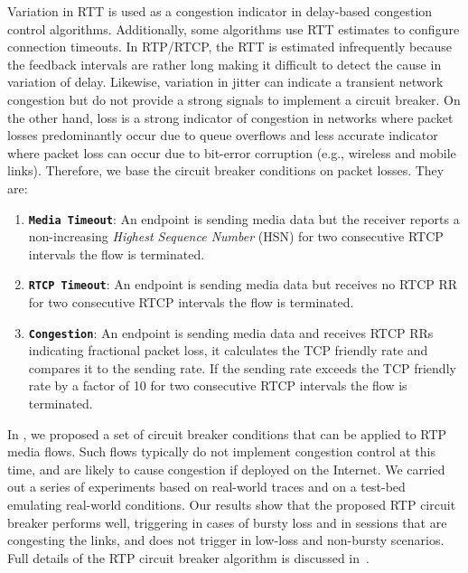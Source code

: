 Variation in RTT is used as a congestion indicator in delay-based congestion
control  algorithms. Additionally, some algorithms use RTT estimates to
configure connection timeouts. In RTP/RTCP, the RTT is estimated infrequently
because the feedback intervals are rather long making it difficult to detect
the cause in  variation of delay. Likewise, variation in jitter can indicate a
transient network congestion but do not  provide a strong signals to implement
a circuit breaker. On the other hand, loss is a strong indicator of congestion
in networks where  packet losses predominantly occur due to queue overflows
and less accurate indicator where packet loss can occur due to bit-error
corruption (e.g., wireless  and mobile links). Therefore, we base the circuit
breaker conditions on packet losses. They are:

\begin{enumerate}
\setlength{\itemsep}{0pt}

\item \textbf{\texttt{Media Timeout}}: An endpoint is sending media data but
the receiver reports a non-increasing \emph{Highest Sequence Number} (HSN) for
two consecutive RTCP intervals the flow is terminated.

\item \textbf{\texttt{RTCP Timeout}}: An endpoint is sending media data but
receives no RTCP RR for two consecutive RTCP intervals the flow is terminated.

\item \textbf{\texttt{Congestion}}: An endpoint is sending media data and
receives RTCP RRs indicating fractional packet loss, it calculates the TCP
friendly rate and compares it to the sending rate. If the sending rate exceeds
the TCP friendly rate  by a factor of 10 for two consecutive RTCP intervals
the flow is terminated.

\end{enumerate}

In , we proposed a set of circuit breaker conditions that can be
applied to RTP media flows. Such flows typically do not implement congestion
control at this time, and are likely to cause congestion if deployed on the
Internet. We carried out a series of experiments based on real-world traces
and on a test-bed emulating real-world conditions. Our results show that the
proposed RTP circuit breaker performs well, triggering in cases of bursty loss
and in sessions that are congesting the links, and does not trigger in
low-loss and non-bursty scenarios. Full details of the RTP circuit breaker
algorithm is discussed in~\cite{draft.rtp.cb}.
